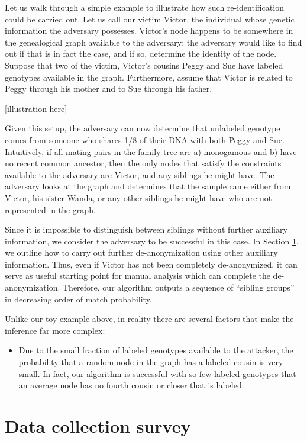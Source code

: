 \documentclass{article}
\begin{document}
Let us walk through a simple example to illustrate how such re-identification could be carried out. Let us call our victim Victor, the individual whose genetic information the adversary possesses.  Victor's node happens to be somewhere in the genealogical graph available to the adversary; the adversary would like to find out if that is in fact the case, and if so, determine the identity of the node. Suppose that two of the victim, Victor's cousins Peggy and Sue have labeled genotypes available in the graph. Furthermore, assume that Victor is related to Peggy through his mother and to Sue through his father.  

[illustration here]

Given this setup, the adversary can now determine that unlabeled genotype comes from someone who shares 1/8 of their DNA with both Peggy and Sue. Intuitively, if all mating pairs in the family tree are a) monogamous and b) have no recent common ancestor, then the only nodes that satisfy the constraints available to the adversary are Victor, and any siblings he might have. The adversary looks at the graph and determines that the sample came either from Victor, his sister Wanda, or any other siblings he might have who are not represented in the graph.

Since it is impossible to distinguish between siblings without further auxiliary information, we consider the adversary to be successful in this case. In Section \ref{}, we outline how to carry out further de-anonymization using other auxiliary information. Thus, even if Victor has not been completely de-anonymized, it can serve as useful starting point for manual analysis which can complete the de-anonymization. Therefore, our algorithm outputs a sequence of ``sibling groups'' in decreasing order of match probability.

Unlike our toy example above, in reality there are several factors that make the inference far more complex: 

\begin{itemize}
\item
Due to the small fraction of labeled genotypes available to the attacker, the probability that a random node in the graph has a labeled cousin is very small. In fact, our algorithm is successful with so few labeled genotypes that an average node has no fourth cousin or closer that is labeled.
\end{itemize}




\section{Data collection survey}
\end{document}
